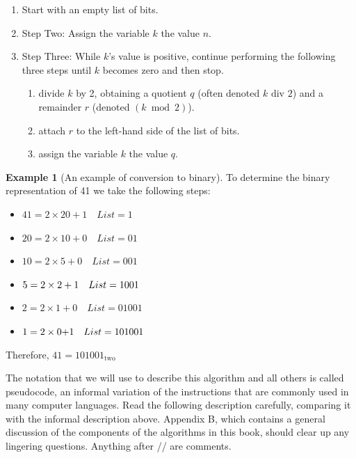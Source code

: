 \documentclass[10pt,]{book}
\theoremstyle{plain}
\theoremstyle{definition}
\theoremstyle{definition}
\theoremstyle{definition}
\newtheorem{example}[theorem]{Example}
\theoremstyle{definition}
\begin{document}
\par
\leavevmode%
\begin{enumerate}[label=\arabic*]
\item\hypertarget{li-163}{} Start with an empty list of bits. %
\item\hypertarget{li-164}{} Step Two: Assign the variable \(k\) the value \(n\). %
\item\hypertarget{li-165}{} Step Three: While \(k\)'s value is positive, continue performing the following three steps until \(k\) becomes zero and then stop. %
\par
%
\begin{enumerate}[label=\alph*]
\item\hypertarget{li-166}{}divide \(k\) by 2, obtaining a quotient \(q\) (often denoted \(k \textrm{ div } 2\)) and a remainder \(r\) (denoted \((k \bmod 2)\)). %
\item\hypertarget{li-167}{}attach \(r\) to the left-hand side of the list of bits. %
\item\hypertarget{li-168}{} assign the variable \(k\) the value \(q\).%
\end{enumerate}
%
\end{enumerate}
%
\begin{example}[An example of conversion to binary]\label{An_example_of_conversion_to_binary}
 To determine the binary representation of 41 we take the following steps:%
\par
\leavevmode%
\begin{itemize}[label=\textbullet]
\item{}\(41 = 2 \times  20+ 1 \quad List = 1 \) %
\item{}\(20 = 2 \times  10+0 \quad List = 01 \)%
\item{} \(10 = 2\times 5 + 0 \quad List = 001 \)%
\item{}\(5 =\text2\times  2+ 1 \quad List =1001\) %
\item{}\(2 =2\times  1+ 0 \quad List = 01001 \)%
\item{}\(1 =\text2 \times 0\text+1  \quad List = 101001\) %
\end{itemize}
%
\par
Therefore, \(41=101001_{\textrm{two}}\)%
\end{example}
\par
The notation that we will use to describe this algorithm and all others is called pseudocode, an informal variation of the instructions that are commonly used in many computer languages. Read the following description carefully, comparing it with the informal description above. Appendix B, which contains a general discussion of the components of the algorithms in this book, should clear up any lingering questions. Anything after // are comments.%
\end{document}
